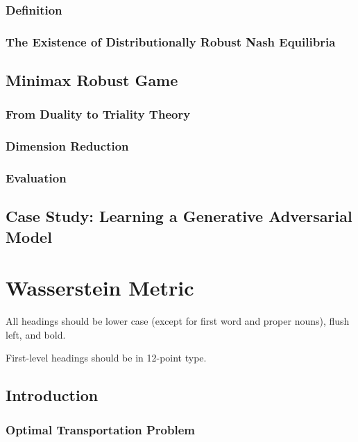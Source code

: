 \documentclass{article}
\begin{document}
\subsubsection{Definition}

\subsubsection{The Existence of Distributionally Robust Nash Equilibria}


\subsection{Minimax Robust Game}

\subsubsection{From Duality to Triality Theory}

\subsubsection{Dimension Reduction}

\subsubsection{Evaluation}


\subsection{Case Study: Learning a Generative Adversarial Model}



\section{Wasserstein Metric}
\label{Sec:Wasserstein}

All headings should be lower case (except for first word and proper
nouns), flush left, and bold.

First-level headings should be in 12-point type.

\subsection{Introduction}

\subsubsection{Optimal Transportation Problem}
\end{document}
